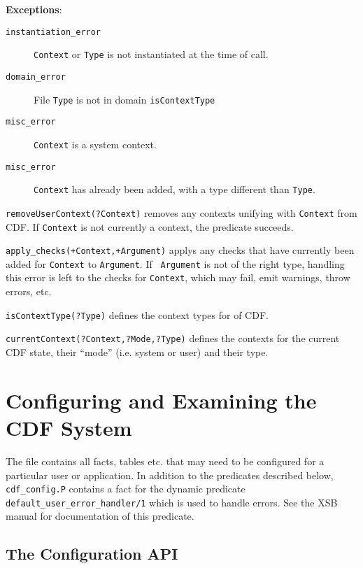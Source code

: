 \begin{description}
{\bf Exceptions}:
    \begin{description}
    \item[{\tt instantiation\_error}]
    	{\tt Context} or {\tt Type} is not instantiated at the time of call. 
    \item[{\tt domain\_error}]
    	File {\tt Type} is not in domain {\tt isContextType}
    \item[{\tt misc\_error}]
    	{\tt Context} is a system context.
    \item[{\tt misc\_error}]
    	{\tt Context} has already been added, with a type different
	    than {\tt Type}.
    \end{description}

{\tt removeUserContext(?Context)} removes any contexts unifying with
{\tt Context} from CDF.  If {\tt Context} is not currently a context,
the predicate succeeds.

{\tt apply\_checks(+Context,+Argument)} applys any checks that have
currently been added for {\tt Context} to {\tt Argument}.  If {\tt
Argument} is not of the right type, handling this error is left to the
checks for {\tt Context}, which may fail, emit warnings, throw errors,
etc.


{\tt isContextType(?Type)} defines the context types for \version{} of
CDF.

{\tt currentContext(?Context,?Mode,?Type)} defines the contexts for
the current CDF state, their ``mode'' (i.e. system or user) and their
type.
%
\end{description}

\section{Configuring and Examining the CDF System} \label{sec:config} 

The file  contains all facts, tables etc. that may
need to be configured for a particular user or application.  In
addition to the predicates described below, {\tt cdf\_config.P}
contains a fact for the dynamic predicate {\tt
default\_user\_error\_handler/1} which is used to handle errors.  See
the XSB manual for documentation of this predicate.

\subsection{The Configuration API} \label{sec:configapi}

